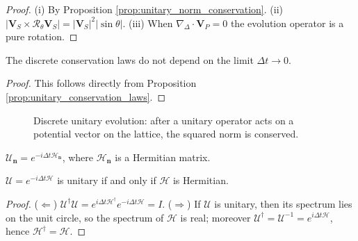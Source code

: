 \begin{proof}
(i) By Proposition \ref{prop:unitary_norm_conservation}. (ii) $|\mathbf{V}_S\times\mathcal{R}_\theta\mathbf{V}_S|=|\mathbf{V}_S|^2|\sin\theta|$. (iii) When $\nabla_{\Delta}\cdot\mathbf{V}_P=0$ the evolution operator is a pure rotation.
\end{proof}

\begin{corollary}\label{cor:unitary_noether}
The discrete conservation laws do not depend on the limit $\Delta t\to 0$.
\end{corollary}

\begin{proof}
This follows directly from Proposition \ref{prop:unitary_conservation_laws}.
\end{proof}

\begin{figure}[htbp]
\centering
{}
\caption{Discrete unitary evolution: after a unitary operator acts on a potential vector on the lattice, the squared norm is conserved.}
\label{fig:discrete_unitary}
\end{figure}

\begin{definition}\label{def:unitary_generator}
$\mathcal{U}_{\mathbf{n}}=e^{-i\Delta t\mathcal{H}_{\mathbf{n}}}$, where $\mathcal{H}_{\mathbf{n}}$ is a Hermitian matrix.
\end{definition}

\begin{proposition}\label{prop:generator_hermitian}
$\mathcal{U}=e^{-i\Delta t\mathcal{H}}$ is unitary if and only if $\mathcal{H}$ is Hermitian.
\end{proposition}

\begin{proof}
($\Leftarrow$) $\mathcal{U}^\dagger\mathcal{U}=e^{i\Delta t\mathcal{H}^\dagger}e^{-i\Delta t\mathcal{H}}=I$. ($\Rightarrow$) If $\mathcal{U}$ is unitary, then its spectrum lies on the unit circle, so the spectrum of $\mathcal{H}$ is real; moreover $\mathcal{U}^\dagger=\mathcal{U}^{-1}=e^{i\Delta t\mathcal{H}}$, hence $\mathcal{H}^\dagger=\mathcal{H}$.
\end{proof}

